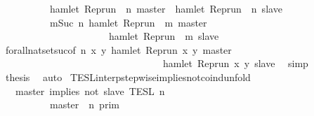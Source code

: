 \begin{isabellebody}
\ \ \ \ \ \ \ \ {\isacharequal}\ {\isacharbraceleft}{\isasymrho}{\isachardot}\ hamlet\ {\isacharparenleft}{\isacharparenleft}Rep{\isacharunderscore}run\ {\isasymrho}{\isacharparenright}\ n\ master{\isacharparenright}\ {\isasymlongrightarrow}\ hamlet\ {\isacharparenleft}{\isacharparenleft}Rep{\isacharunderscore}run\ {\isasymrho}{\isacharparenright}\ n\ slave{\isacharparenright}{\isacharbraceright}\isanewline
\ \ \ \ \ \ \ \ {\isasyminter}\ {\isacharbraceleft}{\isasymrho}{\isachardot}\ {\isasymforall}m{\isasymge}Suc\ n{\isachardot}\ hamlet\ {\isacharparenleft}{\isacharparenleft}Rep{\isacharunderscore}run\ {\isasymrho}{\isacharparenright}\ m\ master{\isacharparenright}\isanewline
\ \ \ \ \ \ \ \ \ \ \ \ \ \ \ \ \ \ \ \ \ {\isasymlongrightarrow}\ hamlet\ {\isacharparenleft}{\isacharparenleft}Rep{\isacharunderscore}run\ {\isasymrho}{\isacharparenright}\ m\ slave{\isacharparenright}{\isacharbraceright}{\isacartoucheclose}\isanewline
\ \ \ \ \isamarkupfalse%
\ forall{\isacharunderscore}nat{\isacharunderscore}set{\isacharunderscore}suc{\isacharbrackleft}of\ {\isacartoucheopen}n{\isacartoucheclose}\ {\isacartoucheopen}{\isasymlambda}x\ y{\isachardot}\ hamlet\ {\isacharparenleft}{\isacharparenleft}Rep{\isacharunderscore}run\ x{\isacharparenright}\ y\ master{\isacharparenright}\isanewline
\ \ \ \ \ \ \ \ \ \ \ \ \ \ \ \ \ \ \ \ \ \ \ \ \ \ \ \ \ \ \ \ {\isasymlongrightarrow}\ hamlet\ {\isacharparenleft}{\isacharparenleft}Rep{\isacharunderscore}run\ x{\isacharparenright}\ y\ slave{\isacharparenright}{\isacartoucheclose}{\isacharbrackright}\ \isamarkupfalse%
\ simp\isanewline
\ \ \isamarkupfalse%
\ {\isacharquery}thesis\ \isamarkupfalse%
\ auto\isanewline
{}\isamarkupfalse%
%
\endisatagproof
{\isafoldproof}%
%
\isadelimproof
\isanewline
%
\endisadelimproof
\isanewline
{}\isamarkupfalse%
\ TESL{\isacharunderscore}interp{\isacharunderscore}stepwise{\isacharunderscore}implies{\isacharunderscore}not{\isacharunderscore}coind{\isacharunderscore}unfold{\isacharcolon}\isanewline
\ \ {\isacartoucheopen}{\isasymlbrakk}\ master\ implies\ not\ slave\ {\isasymrbrakk}\isactrlsub T\isactrlsub E\isactrlsub S\isactrlsub L\isactrlbsup {\isasymge}\ n\isactrlesup \ {\isacharequal}\isanewline
\ \ \ \ \ {\isacharparenleft}\ \ \ \ {\isasymlbrakk}\ master\ {\isasymnot}{\isasymUp}\ n\ {\isasymrbrakk}\isactrlsub p\isactrlsub r\isactrlsub i\isactrlsub m\ \ \ \ \ \ \ \ \ \ \ \ \ \ \ \ \ \ \ \ \ \ \ %
\end{isabellebody}
